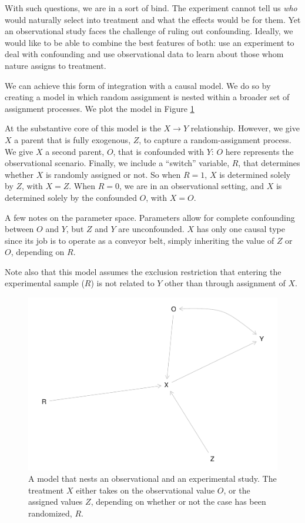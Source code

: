 \documentclass[
  12pt,
]{book}
\begin{document}
With such questions, we are in a sort of bind. The experiment cannot tell us \emph{who} would naturally select into treatment and what the effects would be for them. Yet an observational study faces the challenge of ruling out confounding. Ideally, we would like to be able to combine the best features of both: use an experiment to deal with confounding and use observational data to learn about those whom nature assigns to treatment.

We can achieve this form of integration with a causal model. We do so by creating a model in which random assignment is nested within a broader set of assignment processes. We plot the model in Figure \ref{fig:appcombexpob}

At the substantive core of this model is the \(X \rightarrow Y\) relationship. However, we give \(X\) a parent that is fully exogenous, \(Z\), to capture a random-assignment process. We give \(X\) a second parent, \(O\), that is confounded with \(Y\): \(O\) here represents the observational scenario. Finally, we include a ``switch'' variable, \(R\), that determines whether \(X\) is randomly assigned or not. So when \(R=1\), \(X\) is determined solely by \(Z\), with \(X=Z\). When \(R=0\), we are in an observational setting, and \(X\) is determined solely by the confounded \(O\), with \(X=O\).

A few notes on the parameter space. Parameters allow for complete confounding between \(O\) and \(Y\), but \(Z\) and \(Y\) are unconfounded. \(X\) has only one causal type since its job is to operate as a conveyor belt, simply inheriting the value of \(Z\) or \(O\), depending on \(R\).

Note also that this model assumes the exclusion restriction that entering the experimental sample (\(R\)) is not related to \(Y\) other than through assignment of \(X\).

\begin{figure}

{\centering \includegraphics{ii_files/figure-latex/appcombexpob-1} 

}

\caption{A model that nests an observational and an experimental study. The treatment $X$ either takes on the observational value $O$, or the assigned values $Z$, depending on whether or not the case has been randomized, $R$.}\label{fig:appcombexpob}
\end{figure}
\end{document}
